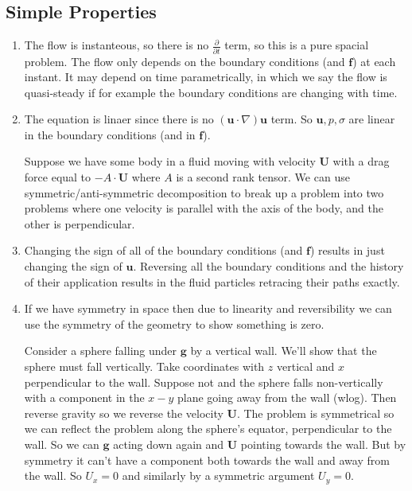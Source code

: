\documentclass{article}
\begin{document}
\subsection{Simple Properties}
\begin{enumerate}
	\item The flow is instanteous, so there is no $ \frac{\partial}{\partial t} $ term, so this is a pure spacial problem. The flow only depends on the boundary conditions (and $ \mathbf f $) at each instant. It may depend on time parametrically, in which we say the flow is quasi-steady if for example the boundary conditions are changing with time.
	\item The equation is linaer since there is no $ (\mathbf u \cdot\nabla)\mathbf u $ term. So $ \mathbf u, p, \sigma $ are linear in the boundary conditions (and in $ \mathbf f $).\par
\begin{example}
  Suppose we have some body in a fluid moving with velocity $ \mathbf U $ with a drag force equal to $ -A\cdot\mathbf U $ where $ A $ is a second rank tensor. We can use symmetric/anti-symmetric decomposition to break up a problem into two problems where one velocity is parallel with the axis of the body, and the other is perpendicular.
\end{example}
\item Changing the sign of all of the boundary conditions (and $\mathbf f $) results in just changing the sign of $ \mathbf u $. Reversing all the boundary conditions and the history of their application results in the fluid particles retracing their paths exactly.
\item If we have symmetry in space then due to linearity and reversibility we can use the symmetry of the geometry to show something is zero.
	\begin{example}
Consider a sphere falling under $ \mathbf g $ by a vertical wall. We'll show that the sphere must fall vertically. Take coordinates with $ z $ vertical and $ x $ perpendicular to the wall. Suppose not and the sphere falls non-vertically with a component in the $ x-y $ plane going away from the wall (wlog). Then reverse gravity so we reverse the velocity $ \mathbf U $. The problem is symmetrical so we can reflect the problem along the sphere's equator, perpendicular to the wall. So we can $ \mathbf g $ acting down again and $ \mathbf U $ pointing towards the wall. But by symmetry it can't have a component both towards the wall and away from the wall. So $ U_x = 0 $ and similarly by a symmetric argument $ U_y = 0 $. 

\end{example}
\end{enumerate}
\end{document}

